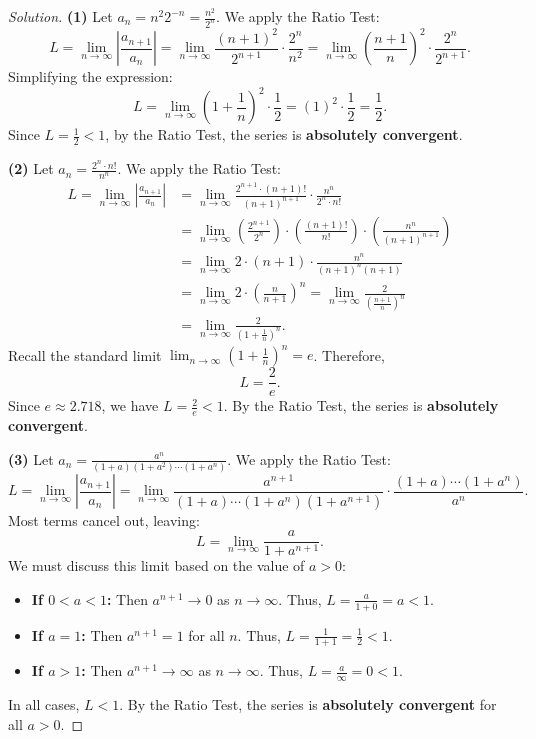 \documentclass[11pt]{article}
\theoremstyle{definition}
\newenvironment{solution}{\begin{proof}[Solution]}{\end{proof}}
\begin{document}
\begin{solution}
\textbf{(1)} Let $a_n = n^2 2^{-n} = \frac{n^2}{2^n}$. We apply the Ratio Test:
\[
L = \lim_{n \to \infty} \left| \frac{a_{n+1}}{a_n} \right| = \lim_{n \to \infty} \frac{(n+1)^2}{2^{n+1}} \cdot \frac{2^n}{n^2} = \lim_{n \to \infty} \left(\frac{n+1}{n}\right)^2 \cdot \frac{2^n}{2^{n+1}}.
\]
Simplifying the expression:
\[
L = \lim_{n \to \infty} \left(1+\frac{1}{n}\right)^2 \cdot \frac{1}{2} = (1)^2 \cdot \frac{1}{2} = \frac{1}{2}.
\]
Since $L = \frac{1}{2} < 1$, by the Ratio Test, the series is \textbf{absolutely convergent}.

\textbf{(2)} Let $a_n = \frac{2^n \cdot n!}{n^n}$. We apply the Ratio Test:
\begin{align*}
L = \lim_{n \to \infty} \left| \frac{a_{n+1}}{a_n} \right| &= \lim_{n \to \infty} \frac{2^{n+1} \cdot (n+1)!}{(n+1)^{n+1}} \cdot \frac{n^n}{2^n \cdot n!} \\
&= \lim_{n \to \infty} \left( \frac{2^{n+1}}{2^n} \right) \cdot \left( \frac{(n+1)!}{n!} \right) \cdot \left( \frac{n^n}{(n+1)^{n+1}} \right) \\
&= \lim_{n \to \infty} 2 \cdot (n+1) \cdot \frac{n^n}{(n+1)^n (n+1)} \\
&= \lim_{n \to \infty} 2 \cdot \left(\frac{n}{n+1}\right)^n = \lim_{n \to \infty} \frac{2}{\left(\frac{n+1}{n}\right)^n} \\
&= \lim_{n \to \infty} \frac{2}{\left(1+\frac{1}{n}\right)^n}.
\end{align*}
Recall the standard limit $\lim_{n \to \infty} \left(1+\frac{1}{n}\right)^n = e$. Therefore,
\[
L = \frac{2}{e}.
\]
Since $e \approx 2.718$, we have $L = \frac{2}{e} < 1$. By the Ratio Test, the series is \textbf{absolutely convergent}.

\textbf{(3)} Let $a_n = \frac{a^n}{(1+a)(1+a^2)\cdots(1+a^n)}$. We apply the Ratio Test:
\[
L = \lim_{n \to \infty} \left| \frac{a_{n+1}}{a_n} \right| = \lim_{n \to \infty} \frac{a^{n+1}}{(1+a)\cdots(1+a^n)(1+a^{n+1})} \cdot \frac{(1+a)\cdots(1+a^n)}{a^n}.
\]
Most terms cancel out, leaving:
\[
L = \lim_{n \to \infty} \frac{a}{1+a^{n+1}}.
\]
We must discuss this limit based on the value of $a > 0$:
\begin{itemize}
    \item \textbf{If $0 < a < 1$:} Then $a^{n+1} \to 0$ as $n \to \infty$. Thus, $L = \frac{a}{1+0} = a < 1$.
    \item \textbf{If $a = 1$:} Then $a^{n+1} = 1$ for all $n$. Thus, $L = \frac{1}{1+1} = \frac{1}{2} < 1$.
    \item \textbf{If $a > 1$:} Then $a^{n+1} \to \infty$ as $n \to \infty$. Thus, $L = \frac{a}{\infty} = 0 < 1$.
\end{itemize}
In all cases, $L < 1$. By the Ratio Test, the series is \textbf{absolutely convergent} for all $a > 0$.
\end{solution}
\end{document}
